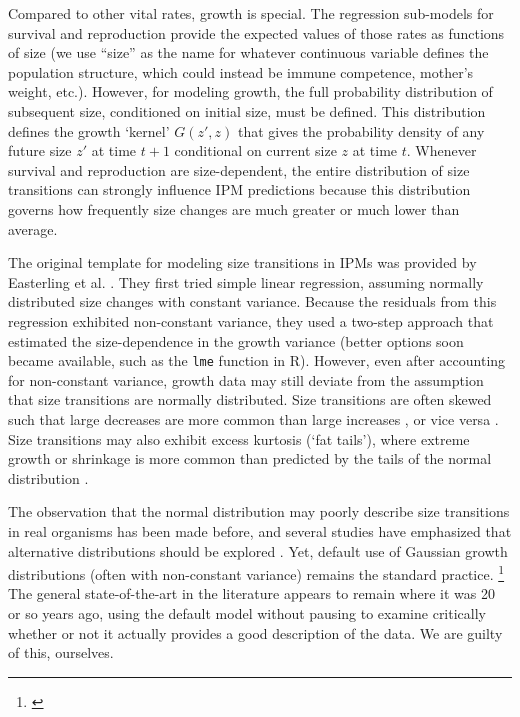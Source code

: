 \documentclass[12pt]{article}
\newcommand{\tom}[2]{{\color{red}{#1}}\footnote{\textit{\color{red}{#2}}}}
\begin{document}
Compared to other vital rates, growth is special. 
The regression sub-models for survival and reproduction provide the expected values of those rates as functions of size (we use ``size'' as the name for whatever continuous variable defines the population structure, which could instead be immune competence, mother's weight, etc.).   
However, for modeling growth, the full probability distribution of subsequent size, conditioned on initial size, must be defined. 
This distribution defines the growth `kernel' $G(z',z)$ that gives the probability density of any future size $z'$ at time $t+1$ conditional on current size $z$ at time $t$. 
Whenever survival and reproduction are size-dependent, the entire distribution of size transitions can strongly influence IPM predictions because this distribution governs how frequently size changes are much greater or much lower than average. 

The original template for modeling size transitions in IPMs was provided by Easterling et al. \citeyear{easterling2000size}. 
They first tried simple linear regression, assuming normally distributed size changes with constant variance. 
Because the residuals from this regression exhibited non-constant variance, they used a two-step approach that estimated the size-dependence in the growth variance (better options soon became available, such as the \texttt{lme} function in R). 
However, even after accounting for non-constant variance, growth data may still deviate from the assumption that size transitions are normally distributed.  
Size transitions are often skewed such that large decreases are more common than large increases \citep{peterson2019improving,salguero2010keeping}, or vice versa \citep{stubberud2019effects}.
Size transitions may also exhibit excess kurtosis (`fat tails'), where extreme growth or shrinkage is more common than predicted by the tails of the normal distribution \citep{herault2011functional}. 

The observation that the normal distribution may poorly describe size transitions in real organisms has been made before,  
and several studies have emphasized that alternative distributions should be explored \citep{easterling2000size,peterson2019improving,rees2014building,williams2012avoiding}. 
Yet, default use of Gaussian growth distributions (often with non-constant variance) remains the standard practice. 
\tom{An ISI Web of Knowledge search on the terms `integral projection model ecology' (DATE) returned \# IPM studies published in the past decade (2010--2020), \# of which assumed a Gaussian growth kernel.}{I still intend to do this! But it's a rabbit hole I have not gone down yet.}
The general state-of-the-art in the literature appears to remain where it was 20 or so years ago, using the default model without pausing to examine critically whether or not it actually provides a good description of the data. 
We are guilty of this, ourselves. 
\end{document}
